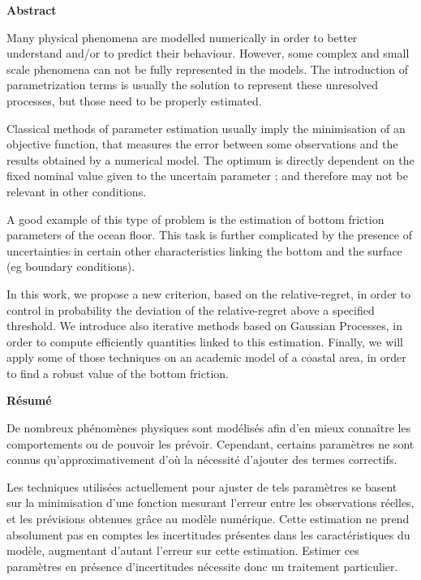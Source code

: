\pagestyle{empty}


\small
\begin{center}
  \bf Abstract
\end{center}
\vspace{0.5cm}
Many physical phenomena are modelled numerically in
order to better understand and/or to predict their behaviour. However,
some complex and small scale phenomena can not be fully represented in
the models. The introduction of parametrization terms is usually the
solution to represent these unresolved processes, but those need to be
properly estimated.

Classical methods of parameter estimation usually imply the
minimisation of an objective function, that measures the error between
some observations and the results obtained by a numerical model. The
optimum is directly dependent on the fixed nominal value given to the
uncertain parameter ; and therefore may not be relevant in other
conditions.

A good example of this type of problem is the estimation of bottom
friction parameters of the ocean floor. This task is further
complicated by the presence of uncertainties in certain other
characteristics linking the bottom and the surface (eg boundary
conditions).

In this work, we propose a new criterion, based on the
relative-regret, in order to control in probability the deviation of
the relative-regret above a specified threshold. We introduce also
iterative methods based on Gaussian Processes, in order to compute
efficiently quantities linked to this estimation.  Finally, we will
apply some of those techniques on an academic model of a coastal area,
in order to find a robust value of the bottom friction.

\vspace{1cm}
\etoile
\vspace{1cm}

\begin{center}
  \bf Résumé
\end{center}
\vspace{0.5cm} De nombreux phénomènes physiques sont modélisés afin
d'en mieux connaître les comportements ou de pouvoir les
prévoir. Cependant, certains paramètres ne sont connus
qu'ap\-proxi\-mati\-vement d'où la nécessité d'ajouter des termes
correctifs.  

Les techniques utilisées actuellement
pour ajuster de tels paramètres se basent sur la minimisation d'une
fonction mesurant l'erreur entre les observations réelles, et les
prévisions obtenues grâce au modèle numérique. Cette estimation ne
prend absolument pas en comptes les incertitudes présentes dans les
caractéristiques du modèle, augmentant d'autant l'erreur sur cette
estimation. Estimer ces paramètres en présence d'incertitudes
nécessite donc un traitement particulier.

